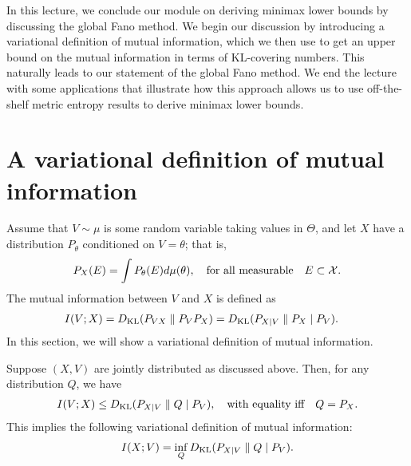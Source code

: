 \documentclass[12pt]{article}
\begin{document}
	\MakeScribeTop
In this lecture, we conclude our module on deriving minimax lower bounds by discussing the global Fano method. We begin our discussion by introducing a variational definition of mutual information, which we then use to get an upper bound on the mutual information in terms of KL-covering numbers. This naturally leads to our statement of the global Fano method. We end the lecture with some applications that illustrate how this approach allows us to use off-the-shelf metric entropy results to derive minimax lower bounds. 

\section{A variational definition of mutual information}
Assume that $V \sim \mu$ is some random variable taking values in $\Theta$, and let $X$ have a distribution $P_\theta$ conditioned on $V=\theta$; that is, 
\begin{align}
P_X(E) = \int P_\theta(E) d\mu(\theta), \quad \text{for all measurable} \quad E \subset {\cal X}. 
\end{align}
The mutual information between $V$ and $X$ is defined as 
\begin{align}
	I(V; X) & = D_{\text{KL}}(P_{VX} \parallel P_V P_X) = D_{\text{KL}}(P_{X|V} \parallel P_X \mid P_V). 
\end{align}
In this section, we will show a variational definition of mutual information. 
\begin{lemma}
\label{lemma:mutual-info-variational} Suppose $(X, V)$ are jointly distributed as discussed above. Then, for any distribution $Q$, we have 
\begin{align}
I(V; X) \leq D_{\text{KL}}(P_{X|V} \parallel Q \mid P_V), \quad \text{with equality iff} \quad Q  = P_X. 
\end{align}
This implies the following variational definition of mutual information: 
\begin{align}
I(X; V) = \inf_{Q} D_{\text{KL}}(P_{X|V} \parallel Q \mid P_V).  \label{eq:information-variational}
\end{align}
\end{lemma}
\end{document}
